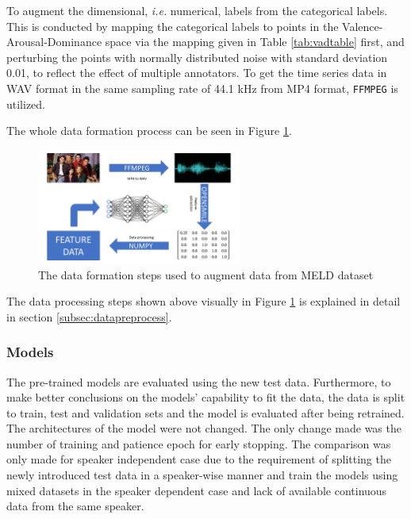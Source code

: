 \documentclass[a4paper,11pt]{article}
\begin{document}
To augment the dimensional, \textit{i.e.} numerical, labels from the categorical labels. This is conducted by mapping the categorical labels to points in the Valence-Arousal-Dominance space via the mapping given in Table \ref{tab:vadtable} first, and perturbing the points with normally distributed noise with standard deviation 0.01, to reflect the effect of multiple annotators. To get the time series data in WAV format in the same sampling rate of 44.1 kHz from MP4 format, \texttt{FFMPEG} \cite{tomar2006converting} is utilized.   

The whole data formation process can be seen in Figure \ref{fig:dataformation}.

\begin{figure}[h]
\centering
\includegraphics[width=0.6\textwidth]{Presentation.png}
\caption{The data formation steps used to augment data from MELD dataset}\label{fig:dataformation}
\end{figure}

The data processing steps shown above visually in Figure \ref{fig:dataformation} is explained in detail in section \ref{subsec:datapreprocess}.

\subsubsection{Models}

The pre-trained models are evaluated using the new test data. Furthermore, to make better conclusions on the models' capability to fit the data, the data is split to train, test and validation sets and the model is evaluated after being retrained. The architectures of the model were not changed. The only change made was the number of training and patience epoch for early stopping. The comparison was only made for speaker independent case due to the requirement of splitting the newly introduced test data in a speaker-wise manner and train the models using mixed datasets in the speaker dependent case and lack of available continuous data from the same speaker.

\pagebreak
\end{document}
